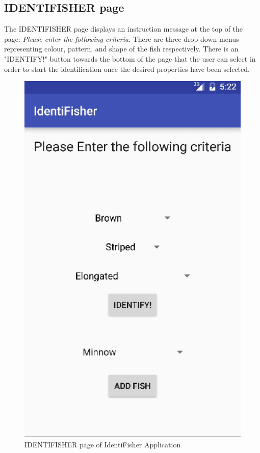 \documentclass{article}
\begin{document}
\subsection{IDENTIFISHER page}
The IDENTIFISHER page displays an instruction message at the top of the page: \textit{Please enter the following criteria}. There are three
drop-down menus representing colour, pattern, and shape of the fish respectively. There is an "IDENTIFY!" button towards the bottom of the page that the user can select in order to start the identification once the desired properties have been selected.\\

\begin{figure}[H]
	\includegraphics[scale=0.30]{IdentiFisher.png}
	\caption{IDENTIFISHER page of IdentiFisher Application}
\end{figure}
\end{document}
